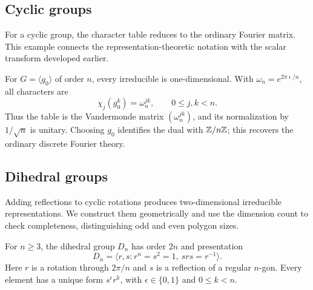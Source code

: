 \subsection{Cyclic groups}

For a cyclic group, the character table reduces to the ordinary Fourier
matrix. This example connects the representation-theoretic notation with the
scalar transform developed earlier.

For $G=\langle g_0\rangle$ of order $n$, every irreducible is
one-dimensional. With $\omega_n=e^{2\pi\imath/n}$, all characters are
\[
 \chi_j(g_0^k)=\omega_n^{jk},\qquad 0\leq j,k<n.
\]
Thus the table is the Vandermonde matrix $(\omega_n^{jk})$, and its
normalization by $1/\sqrt n$ is unitary. Choosing $g_0$ identifies the
dual with $\mathbb{Z}/n\mathbb{Z}$; this recovers the ordinary discrete Fourier theory.

\subsection{Dihedral groups}

Adding reflections to cyclic rotations produces two-dimensional irreducible
representations. We construct them geometrically and use the dimension count
to check completeness, distinguishing odd and even polygon sizes.

For $n\geq3$, the dihedral group $D_n$ has order $2n$ and presentation
\[
 D_n=\langle r,s:r^n=s^2=1,\ srs=r^{-1}\rangle.
\]
Here $r$ is a rotation through $2\pi/n$ and $s$ is a reflection of a
regular $n$-gon. Every element has a unique form $s^\epsilon r^k$,
with $\epsilon\in\{0,1\}$ and $0\leq k<n$.

